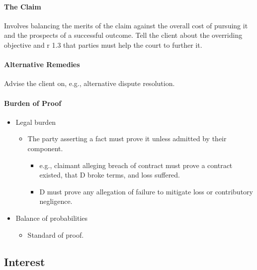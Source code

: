 \documentclass[
]{article}
\providecommand{\tightlist}{%
  \setlength{\itemsep}{0pt}\setlength{\parskip}{0pt}}
\begin{document}
\hypertarget{the-claim}{%
\paragraph{The Claim}\label{the-claim}}

Involves balancing the merits of the claim against the overall cost of
pursuing it and the prospects of a successful outcome. Tell the client
about the overriding objective and r 1.3 that parties must help the
court to further it.

\hypertarget{alternative-remedies}{%
\paragraph{Alternative Remedies}\label{alternative-remedies}}

Advise the client on, e.g., alternative dispute resolution.

\hypertarget{burden-of-proof}{%
\paragraph{Burden of Proof}\label{burden-of-proof}}

\begin{itemize}
\tightlist
\item
  Legal burden

  \begin{itemize}
  \tightlist
  \item
    The party asserting a fact must prove it unless admitted by their
    component.

    \begin{itemize}
    \tightlist
    \item
      e.g., claimant alleging breach of contract must prove a contract
      existed, that D broke terms, and loss suffered.
    \item
      D must prove any allegation of failure to mitigate loss or
      contributory negligence.
    \end{itemize}
  \end{itemize}
\item
  Balance of probabilities

  \begin{itemize}
  \tightlist
  \item
    Standard of proof.
  \end{itemize}
\end{itemize}

\hypertarget{interest}{%
\subsection{Interest}\label{interest}}
\end{document}

